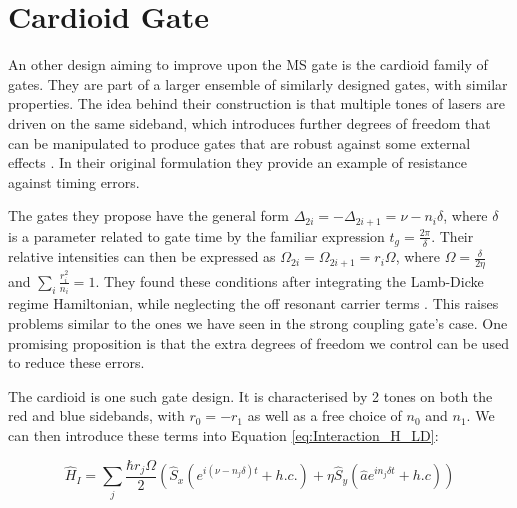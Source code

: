 \documentclass[12pt,twoside]{report}
\begin{document}
\section{Cardioid Gate}
\label{Driving_schemes:Cardioid}

An other design aiming to improve upon the MS gate is the cardioid family of gates. They are part of a larger ensemble of similarly designed gates, with similar properties. The idea behind their construction is that multiple tones of lasers are driven on the same sideband, which introduces further degrees of freedom that can be manipulated to produce gates that are robust against some external effects \cite{Cardioid}. In their original formulation they provide an example of resistance against timing errors.

The gates they propose have the general form $\Delta_{2i} = -\Delta_{2i + 1} = \nu - n_i\delta$, where $\delta$ is a parameter related to gate time by the familiar expression $t_g = \frac{2\pi}{\delta}$. Their relative intensities can then be expressed as $\Omega_{2i} = \Omega_{2i + 1} = r_i\Omega$, where  $\Omega = \frac{\delta}{2\eta}$ and $\sum_{i}\frac{r_i^2}{n_i} = 1$. They found these conditions after integrating the Lamb-Dicke regime Hamiltonian, while neglecting the off resonant carrier terms \cite{Cardioid}. This raises problems similar to the ones we have seen in the strong coupling gate's case. One promising proposition is that the extra degrees of freedom we control can be used to reduce these errors.

The cardioid is one such gate design. It is characterised by 2 tones on both the red and blue sidebands, with $r_0 = -r_1$ as well as a free choice of $n_0$ and $n_1$. We can then introduce these terms into Equation \eqref{eq:Interaction_H_LD}:

\begin{equation}
	\hat{H}_I = \sum_j \frac{\hbar r_j\Omega}{2}(\hat{S}_x (e^{i(\nu - n_j\delta)t} + h.c.) + \eta \hat{S}_y (\hat{a}e^{in_j\delta t} + h.c))
	\label{eq:Cardioid}
\end{equation}
\end{document}
